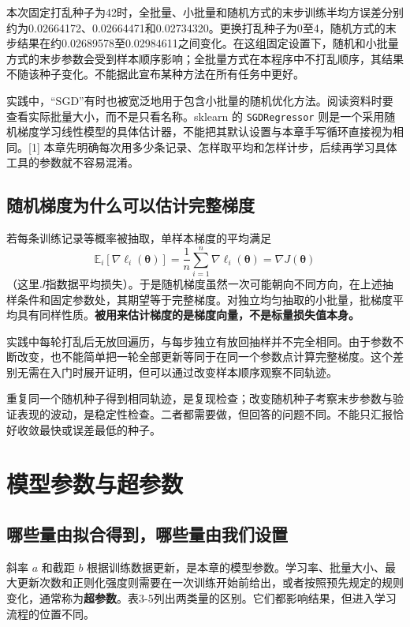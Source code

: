 本次固定打乱种子为42时，全批量、小批量和随机方式的末步训练半均方误差分别约为0.02664172、0.02664471和0.02734320。更换打乱种子为0至4，随机方式的末步结果在约0.02689578至0.02984611之间变化。在这组固定设置下，随机和小批量方式的末步参数会受到样本顺序影响；全批量方式在本程序中不打乱顺序，其结果不随该种子变化。不能据此宣布某种方法在所有任务中更好。

实践中，``SGD''有时也被宽泛地用于包含小批量的随机优化方法。阅读资料时要查看实际批量大小，而不是只看名称。sklearn 的 \texttt{SGDRegressor} 则是一个采用随机梯度学习线性模型的具体估计器，不能把其默认设置与本章手写循环直接视为相同。{[}1{]} 本章先明确每次用多少条记录、怎样取平均和怎样计步，后续再学习具体工具的参数就不容易混淆。

\subsection{随机梯度为什么可以估计完整梯度}
若每条训练记录等概率被抽取，单样本梯度的平均满足
\[
\mathbb E_i[\nabla\ell_i(\boldsymbol\theta)]
=\frac1n\sum_{i=1}^n\nabla\ell_i(\boldsymbol\theta)=\nabla J(\boldsymbol\theta)
\]
（这里$J$指数据平均损失）。于是随机梯度虽然一次可能朝向不同方向，在上述抽样条件和固定参数处，其期望等于完整梯度。对独立均匀抽取的小批量，批梯度平均具有同样性质。\textbf{被用来估计梯度的是梯度向量，不是标量损失值本身。}

实践中每轮打乱后无放回遍历，与每步独立有放回抽样并不完全相同。由于参数不断改变，也不能简单把一轮全部更新等同于在同一个参数点计算完整梯度。这个差别无需在入门时展开证明，但可以通过改变样本顺序观察不同轨迹。

重复同一个随机种子得到相同轨迹，是复现检查；改变随机种子考察末步参数与验证表现的波动，是稳定性检查。二者都需要做，但回答的问题不同。不能只汇报恰好收敛最快或误差最低的种子。

\section{模型参数与超参数}

\subsection{哪些量由拟合得到，哪些量由我们设置}

斜率 \(a\) 和截距 \(b\) 根据训练数据更新，是本章的模型参数。学习率、批量大小、最大更新次数和正则化强度则需要在一次训练开始前给出，或者按照预先规定的规则变化，通常称为\textbf{超参数}。表3-5列出两类量的区别。它们都影响结果，但进入学习流程的位置不同。

